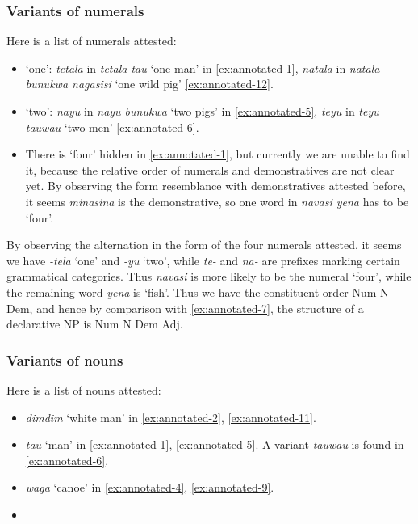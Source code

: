 \documentclass{article}
\newcommand*{\corpus}[1]{\emph{#1}}
\newcommand{\translate}[1]{`#1'}
\begin{document}
\subsubsection{Variants of numerals}

Here is a list of numerals attested:
\begin{itemize}
    \item \translate{one}: 
    \corpus{tetala} in \corpus{tetala tau} \translate{one man} in \eqref{ex:annotated-1},
    \corpus{natala} in \corpus{natala bunukwa nagasisi} \translate{one wild pig} \eqref{ex:annotated-12}.
    \item \translate{two}: 
    \corpus{nayu} in \corpus{nayu bunukwa} \translate{two pigs} in \eqref{ex:annotated-5},
    \corpus{teyu} in \corpus{teyu tauwau} \translate{two men} \eqref{ex:annotated-6}.
    \item There is \translate{four} hidden in \eqref{ex:annotated-1}, 
    but currently we are unable to find it,
    because the relative order of numerals and demonstratives are not clear yet.
    By observing the form resemblance with demonstratives attested before, 
    it seems \corpus{minasina} is the demonstrative,
    so one word in \corpus{navasi yena} has to be \translate{four}.
\end{itemize}

By observing the alternation in the form of the four numerals attested,
it seems we have \corpus{-tela} \translate{one} and \corpus{-yu} \translate{two},
while \corpus{te-} and \corpus{na-} are prefixes marking certain grammatical categories.
Thus \corpus{navasi} is more likely to be the numeral \translate{four}, \marginnote{\corpus{navasi}, \corpus{yena}}
while the remaining word \corpus{yena} is \translate{fish}. 
Thus we have the constituent order Num N Dem,
and hence by comparison with \eqref{ex:annotated-7},
the structure of a declarative NP is Num N Dem Adj. 

\subsubsection{Variants of nouns}

Here is a list of nouns attested:
\begin{itemize}
    \item \corpus{dimdim} \translate{white man} in \eqref{ex:annotated-2}, \eqref{ex:annotated-11}.
    \item \corpus{tau} \translate{man} in \eqref{ex:annotated-1}, \eqref{ex:annotated-5}.
    A variant \corpus{tauwau} is found in \eqref{ex:annotated-6}.
    \item \corpus{waga} \translate{canoe} in \eqref{ex:annotated-4}, \eqref{ex:annotated-9}.
    \item 
\end{itemize}
\end{document}
